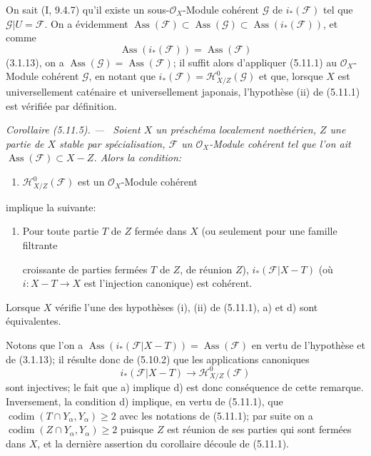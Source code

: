 \documentclass[10pt,oneside]{book}
\newcommand{\oldpage}[2][]{%
  \setcounter{footnote}{0}%
  \marginpar{\scriptsize\textbf{#1}~|~#2}\ignorespaces}
\newenvironment{corollary}[1][]{%
  \par\medskip\noindent\itshape Corollaire (#1). ---\ }{\par}
\begin{document}
On sait (I, 9.4.7) qu'il existe un sous-$\mathcal O_X$-Module cohérent
$\mathcal G$ de $i_*(\mathcal F)$ tel que $\mathcal G\vert U=\mathcal F$. On a
évidemment
$\operatorname{Ass}(\mathcal F)\subset\operatorname{Ass}(\mathcal G)
\subset\operatorname{Ass}(i_*(\mathcal F))$, et comme
\[
\operatorname{Ass}(i_*(\mathcal F))=\operatorname{Ass}(\mathcal F)
\]
(3.1.13), on a $\operatorname{Ass}(\mathcal G)=\operatorname{Ass}(\mathcal F)$;
il suffit alors d'appliquer (5.11.1) au $\mathcal O_X$-Module cohérent
$\mathcal G$, en notant que $i_*(\mathcal F)=\mathcal H^0_{X/Z}(\mathcal G)$
et que, lorsque $X$ est universellement caténaire et universellement japonais,
l'hypothèse (ii) de (5.11.1) est vérifiée par définition.

\begin{corollary}[5.11.5]
\label{IV.2.s5.11.5-fr}
Soient $X$ un préschéma localement noethérien, $Z$ une partie de $X$ stable par
spécialisation, $\mathcal F$ un $\mathcal O_X$-Module cohérent tel que l'on ait
$\operatorname{Ass}(\mathcal F)\subset X-Z$. Alors la condition:
\begin{enumerate}
\item[a)] $\mathcal H^0_{X/Z}(\mathcal F)$ est un $\mathcal O_X$-Module
cohérent
\end{enumerate}
implique la suivante:
\begin{enumerate}
\item[d)] Pour toute partie $T$ de $Z$ fermée dans $X$ (ou seulement pour une
famille filtrante

\oldpage[IV-2]{125}

croissante de parties fermées $T$ de $Z$, de réunion $Z$),
$i_*(\mathcal F\vert X-T)$ (où $i:X-T\to X$ est l'injection canonique) est
cohérent.
\end{enumerate}
Lorsque $X$ vérifie l'une des hypothèses (i), (ii) de (5.11.1), a) et d) sont
équivalentes.
\end{corollary}

Notons que l'on a
$\operatorname{Ass}(i_*(\mathcal F\vert X-T))=\operatorname{Ass}(\mathcal F)$
en vertu de l'hypothèse et de (3.1.13); il résulte donc de (5.10.2) que les
applications canoniques
\[
i_*(\mathcal F\vert X-T)\longrightarrow\mathcal H^0_{X/Z}(\mathcal F)
\]
sont injectives; le fait que a) implique d) est donc conséquence de cette
remarque. Inversement, la condition d) implique, en vertu de (5.11.1), que
$\operatorname{codim}(T\cap Y_\alpha,Y_\alpha)\geq2$ avec les notations de
(5.11.1); par suite on a
$\operatorname{codim}(Z\cap Y_\alpha,Y_\alpha)\geq2$ puisque $Z$ est réunion
de ses parties qui sont fermées dans $X$, et la dernière assertion du
corollaire découle de (5.11.1).
\end{document}
